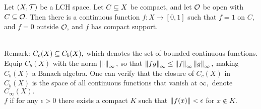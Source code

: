 \begin{prop}
Let $(X,\mathcal{T})$ be a LCH space. Let $C\subseteq X$ be compact, and let $\mathcal{O}$ be open with $C\subseteq\mathcal{O}.$ Then there is a continuous function $f:X\rightarrow[0,1]$ such that $f=1$ on $C,$ and $f=0$ outside $\mathcal{O},$ and $f$ has compact support. \\ \\
\end{prop}

\noindent Remark: $C_c(X)\subseteq C_b(X),$ which denotes the set of bounded continuous functions. Equip $C_b(X)$ with the norm $\left\lVert\cdot\right\rVert_{\infty},$ so that $\left\lVert fg\right\rVert_{\infty}\leq\left\lVert f\right\rVert_{\infty}\left\lVert g\right\rVert_{\infty},$ making $C_b(X)$ a Banach algebra. One can verify that the closure of $C_c(X)$ in $C_b(X)$ is the space of all continuous functions that vanish at $\infty,$ denote $C_{\infty}(X).$ \\
$f$  if for any $\epsilon>0$ there exists a compact $K$ such that $\left\lVert f(x)\right\rVert<\epsilon$ for $x\not\in K.$